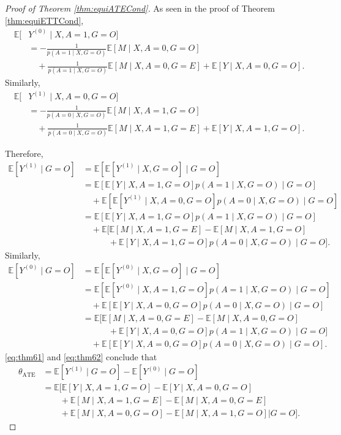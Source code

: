 \documentclass[10pt]{article}
\newcommand{\E}{\mathbb{E}}
\begin{document}
\begin{proof}[Proof of Theorem \ref{thm:equiATECond}]
As seen in the proof of Theorem \ref{thm:equiETTCond},
\begin{align*}
\E[&Y^{(0)}\mid  X,A=1,G=O]\\
&=-\frac{1}{p(A=1\mid X,G=O)}\E[M\mid X,A=0,G=O]\\
&\quad+\frac{1}{p(A=1\mid X,G=O)}\E[M\mid X,A=0,G=E]+\E[Y\mid  X,A=0,G=O].
\end{align*}
Similarly,
\begin{align*}
\E[&Y^{(1)}\mid  X,A=0,G=O]\\
&=-\frac{1}{p(A=0\mid X,G=O)}\E[M\mid X,A=1,G=O]\\
&\quad+\frac{1}{p(A=0\mid X,G=O)}\E[M\mid X,A=1,G=E]+\E[Y\mid  X,A=1,G=O].
\end{align*}

Therefore,
\begin{equation}
\label{eq:thm61}
\begin{aligned}
\E[Y^{(1)}\mid G=O]
&=\E[\E[Y^{(1)}\mid X,G=O]\mid G=O]\\
&=\E[\E[Y\mid X,A=1,G=O]p(A=1\mid X,G=O)\mid G=O]\\
&\quad+\E[\E[Y^{(1)}\mid X,A=0,G=O]p(A=0\mid X,G=O)\mid G=O]\\
&=\E[\E[Y\mid X,A=1,G=O]p(A=1\mid X,G=O)\mid G=O]\\
&\quad+\E[\E[M\mid X,A=1,G=E]-\E[M\mid X,A=1,G=O]\\
&\quad\quad\quad+\E[Y\mid X,A=1,G=O]p(A=0\mid X,G=O)\mid G=O].
\end{aligned}
\end{equation}
Similarly,
\begin{equation}
\label{eq:thm62}
\begin{aligned}
\E[Y^{(0)}\mid G=O]
&=\E[\E[Y^{(0)}\mid X,G=O]\mid G=O]\\
&=\E[\E[Y^{(0)}\mid X,A=1,G=O]p(A=1\mid X,G=O)\mid G=O]\\
&\quad+\E[\E[Y\mid X,A=0,G=O]p(A=0\mid X,G=O)\mid G=O]\\
&=\E[\E[M\mid X,A=0,G=E]-\E[M\mid X,A=0,G=O]\\
&\quad\quad\quad+\E[Y\mid X,A=0,G=O]p(A=1\mid X,G=O)\mid G=O]\\
&\quad+\E[\E[Y\mid X,A=0,G=O]p(A=0\mid X,G=O)\mid G=O].
\end{aligned}
\end{equation}
\eqref{eq:thm61} and \eqref{eq:thm62} conclude that 
\begin{align*}
\theta_{\text{ATE}} &=\E[Y^{(1)}\mid G=O]-\E[Y^{(0)}\mid G=O]\\
&=\E\big[
\E[Y\mid X,A=1,G=O]-\E[Y\mid X,A=0,G=O]\\
&\quad\quad+\E[M\mid X,A=1,G=E]-\E[M\mid X,A=0,G=E]\\
&\quad\quad+\E[M\mid X,A=0,G=O]-\E[M\mid X,A=1,G=O]
\big| G=O\big].
\end{align*}
\end{proof}
\end{document}
